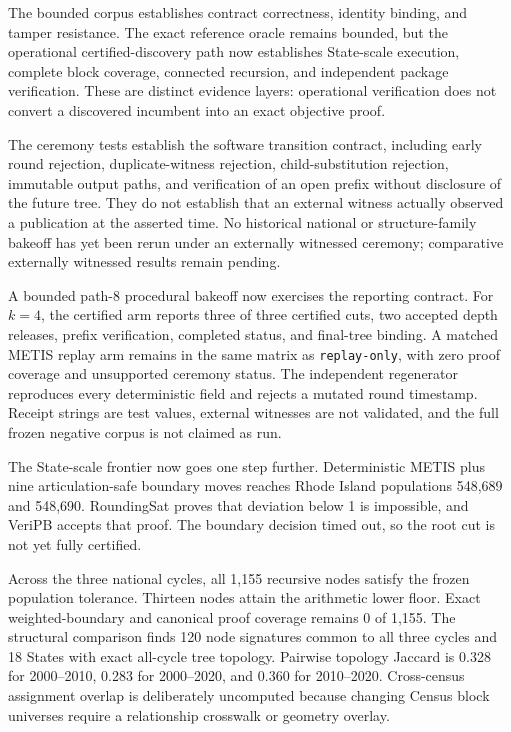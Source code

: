 The bounded corpus establishes contract correctness, identity binding, and
tamper resistance. The exact reference oracle remains bounded, but the
operational certified-discovery path now establishes State-scale execution,
complete block coverage, connected recursion, and independent package
verification. These are distinct evidence layers: operational verification
does not convert a discovered incumbent into an exact objective proof.

The ceremony tests establish the software transition contract, including early
round rejection, duplicate-witness rejection, child-substitution rejection,
immutable output paths, and verification of an open prefix without disclosure
of the future tree. They do not establish that an external witness actually
observed a publication at the asserted time. No historical national or
structure-family bakeoff has yet been rerun under an externally witnessed
ceremony; comparative externally witnessed results remain pending.

A bounded path-8 procedural bakeoff now exercises the reporting contract. For
$k=4$, the certified arm reports three of three certified cuts, two accepted
depth releases, prefix verification, completed status, and final-tree binding.
A matched METIS replay arm remains in the same matrix as \texttt{replay-only},
with zero proof coverage and unsupported ceremony status. The independent
regenerator reproduces every deterministic field and rejects a mutated round
timestamp. Receipt strings are test values, external witnesses are not
validated, and the full frozen negative corpus is not claimed as run.

The State-scale frontier now goes one step further. Deterministic METIS plus
nine articulation-safe boundary moves reaches Rhode Island populations
548,689 and 548,690. RoundingSat proves that deviation below 1 is impossible,
and VeriPB accepts that proof. The boundary decision timed out, so the root cut
is not yet fully certified.

Across the three national cycles, all 1,155 recursive nodes satisfy the frozen
population tolerance. Thirteen nodes attain the arithmetic lower floor. Exact
weighted-boundary and canonical proof coverage remains 0 of 1,155. The
structural comparison finds 120 node signatures common to all three cycles and
18 States with exact all-cycle tree topology. Pairwise topology Jaccard is
0.328 for 2000--2010, 0.283 for 2000--2020, and 0.360 for 2010--2020.
Cross-census assignment overlap is deliberately uncomputed because changing
Census block universes require a relationship crosswalk or geometry overlay.

